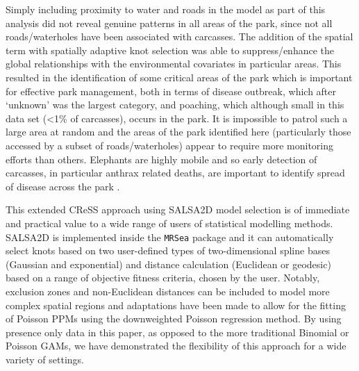 \documentclass[letterpaper]{interact}
\begin{document}
Simply including proximity to water and roads in the model as part of this analysis did not reveal genuine patterns in all areas of the park, since not all roads/waterholes have been associated with carcasses. The addition of the spatial term with spatially adaptive knot selection was able to suppress/enhance the global relationships with the environmental covariates in particular areas. This resulted in the identification of some critical areas of the park which is important for effective park management, both in terms of disease outbreak, which after `unknown' was the largest category, and poaching, which although small in this data set (\textless{}1\% of carcasses), occurs in the park. It is impossible to patrol such a large area at random and the areas of the park identified here (particularly those accessed by a subset of roads/waterholes) appear to require more monitoring efforts than others. Elephants are highly mobile and so early detection of carcasses, in particular anthrax related deaths, are important to identify spread of disease across the park \cite{Lind1994}.

This extended CReSS approach using SALSA2D model selection is of immediate and practical value to a wide range of users of statistical modelling methods. SALSA2D is implemented inside the \texttt{MRSea} package and it can automatically select knots based on two user-defined types of two-dimensional spline bases (Gaussian and exponential) and distance calculation (Euclidean or geodesic) based on a range of objective fitness criteria, chosen by the user. Notably, exclusion zones and non-Euclidean distances can be included to model more complex spatial regions \cite[as seen in][]{scott2014, scott2017} and adaptations have been made to allow for the fitting of Poisson PPMs using the downweighted Poisson regression method. By using presence only data in this paper, as opposed to the more traditional Binomial or Poisson GAMs, we have demonstrated the flexibility of this approach for a wide variety of settings. 


\end{document}
